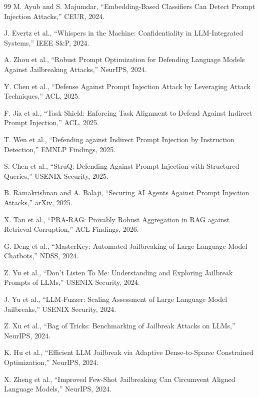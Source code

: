 \documentclass[11pt,a4paper,onecolumn]{article}
\begin{document}
\begin{thebibliography}{99}
M. Ayub and S. Majumdar, ``Embedding-Based Classifiers Can Detect Prompt Injection Attacks,'' CEUR, 2024.

J. Evertz et al., ``Whispers in the Machine: Confidentiality in LLM-Integrated Systems,'' IEEE S\&P, 2024.

A. Zhou et al., ``Robust Prompt Optimization for Defending Language Models Against Jailbreaking Attacks,'' NeurIPS, 2024.

Y. Chen et al., ``Defense Against Prompt Injection Attack by Leveraging Attack Techniques,'' ACL, 2025.

F. Jia et al., ``Task Shield: Enforcing Task Alignment to Defend Against Indirect Prompt Injection,'' ACL, 2025.

T. Wen et al., ``Defending against Indirect Prompt Injection by Instruction Detection,'' EMNLP Findings, 2025.

S. Chen et al., ``StruQ: Defending Against Prompt Injection with Structured Queries,'' USENIX Security, 2025.

B. Ramakrishnan and A. Balaji, ``Securing AI Agents Against Prompt Injection Attacks,'' arXiv, 2025.

X. Tan et al., ``PRA-RAG: Provably Robust Aggregation in RAG against Retrieval Corruption,'' ACL Findings, 2026.

G. Deng et al., ``MasterKey: Automated Jailbreaking of Large Language Model Chatbots,'' NDSS, 2024.

Z. Yu et al., ``Don't Listen To Me: Understanding and Exploring Jailbreak Prompts of LLMs,'' USENIX Security, 2024.

J. Yu et al., ``LLM-Fuzzer: Scaling Assessment of Large Language Model Jailbreaks,'' USENIX Security, 2024.

Z. Xu et al., ``Bag of Tricks: Benchmarking of Jailbreak Attacks on LLMs,'' NeurIPS, 2024.

K. Hu et al., ``Efficient LLM Jailbreak via Adaptive Dense-to-Sparse Constrained Optimization,'' NeurIPS, 2024.

X. Zheng et al., ``Improved Few-Shot Jailbreaking Can Circumvent Aligned Language Models,'' NeurIPS, 2024.


\end{thebibliography}
\end{document}
